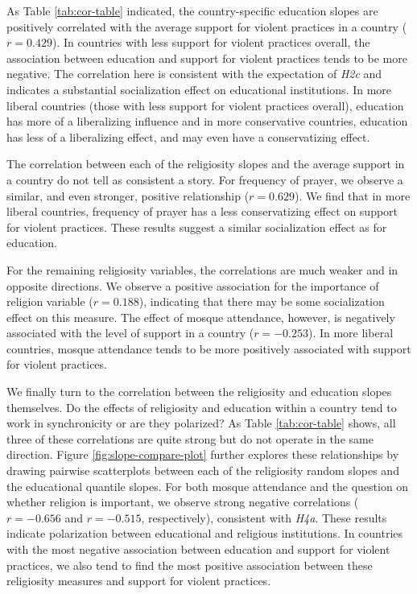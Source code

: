 \documentclass[10pt,letterpaper]{article}
\begin{document}
As Table \ref{tab:cor-table} indicated, the country-specific education slopes are positively correlated with the average support for violent practices in a country (\(r=0.429\)). In countries with less support for violent practices overall, the association between education and support for violent practices tends to be more negative. The correlation here is consistent with the expectation of \emph{H2c} and indicates a substantial socialization effect on educational institutions. In more liberal countries (those with less support for violent practices overall), education has more of a liberalizing influence and in more conservative countries, education has less of a liberalizing effect, and may even have a conservatizing effect.

The correlation between each of the religiosity slopes and the average support in a country do not tell as consistent a story. For frequency of prayer, we observe a similar, and even stronger, positive relationship (\(r=0.629\)). We find that in more liberal countries, frequency of prayer has a less conservatizing effect on support for violent practices. These results suggest a similar socialization effect as for education.

For the remaining religiosity variables, the correlations are much weaker and in opposite directions. We observe a positive association for the importance of religion variable (\(r=0.188\)), indicating that there may be some socialization effect on this measure. The effect of mosque attendance, however, is negatively associated with the level of support in a country (\(r=-0.253\)). In more liberal countries, mosque attendance tends to be more positively associated with support for violent practices.

We finally turn to the correlation between the religiosity and education slopes themselves. Do the effects of religiosity and education within a country tend to work in synchronicity or are they polarized? As Table \ref{tab:cor-table} shows, all three of these correlations are quite strong but do not operate in the same direction. Figure \ref{fig:slope-compare-plot} further explores these relationships by drawing pairwise scatterplots between each of the religiosity random slopes and the educational quantile slopes. For both mosque attendance and the question on whether religion is important, we observe strong negative correlations (\(r=-0.656\) and \(r=-0.515\), respectively), consistent with \emph{H4a}. These results indicate polarization between educational and religious institutions. In countries with the most negative association between education and support for violent practices, we also tend to find the most positive association between these religiosity measures and support for violent practices.
\end{document}

